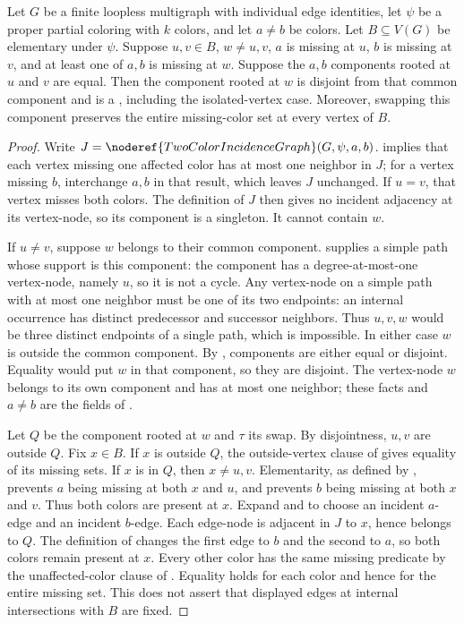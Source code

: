 \begin{helper}
Let $G$ be a finite loopless multigraph with individual edge identities,
let $\psi$ be a proper partial coloring with $k$ colors, and let $a\ne b$
be colors. Let $B\subseteq V(G)$ be elementary under $\psi$.
Suppose $u,v\in B$, $w\ne u,v$, $a$ is missing at $u$, $b$ is missing
at $v$, and at least one of $a,b$ is missing at $w$. Suppose the
$a,b$ components rooted at $u$ and $v$ are equal. Then the component
rooted at $w$ is disjoint from that common component and is a
, including the isolated-vertex case.
Moreover, swapping this component preserves the entire missing-color
set at every vertex of $B$.
\end{helper}
\begin{proof}
Write $J=\noderef{TwoColorIncidenceGraph}(G,\psi,a,b)$.
 implies that each vertex missing
one affected color has at most one neighbor in $J$; for a vertex missing
$b$, interchange $a,b$ in that result, which leaves $J$ unchanged.
If $u=v$, that vertex misses both colors. The definition of $J$ then
gives no incident adjacency at its vertex-node, so its component is a
singleton. It cannot contain $w$.

If $u\ne v$, suppose $w$ belongs to their common component.
 supplies a simple path whose
support is this component: the component has a degree-at-most-one
vertex-node, namely $u$, so it is not a cycle. Any vertex-node on a
simple path with at most one neighbor must be one of its two endpoints:
an internal occurrence has distinct predecessor and successor neighbors.
Thus $u,v,w$ would be three distinct endpoints of a single path, which
is impossible. In either case $w$ is outside the common component.
By , components are either equal
or disjoint. Equality would put $w$ in that component, so they are
disjoint. The vertex-node $w$ belongs to its own component and has at
most one neighbor; these facts and $a\ne b$ are the fields of
.

Let $Q$ be the component rooted at $w$ and $\tau$ its swap. By
disjointness, $u,v$ are outside $Q$. Fix $x\in B$. If $x$ is outside
$Q$, the outside-vertex clause of
 gives equality of its
missing sets. If $x$ is in $Q$, then $x\ne u,v$. Elementarity, as
defined by , prevents $a$ being
missing at both $x$ and $u$, and prevents $b$ being missing at both
$x$ and $v$. Thus both colors are present at $x$. Expand
 and  to choose an
incident $a$-edge and an incident $b$-edge. Each edge-node is adjacent
in $J$ to $x$, hence belongs to $Q$. The definition of
 changes the first edge to $b$ and the
second to $a$, so both colors remain present at $x$. Every other color
has the same missing predicate by the unaffected-color clause of
. Equality holds for
each color and hence for the entire missing set. This does not assert
that displayed edges at internal intersections with $B$ are fixed.
\end{proof}
